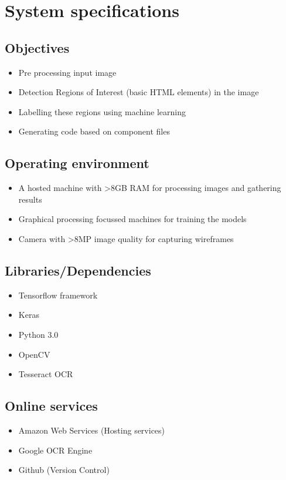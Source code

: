 
\chapter{System specifications}

  \section{Objectives}
    \begin{itemize}
      \item Pre processing input image
      \item Detection Regions of Interest (basic HTML elements) in the image
      \item Labelling these regions using machine learning
      \item Generating code based on component files
  	\end{itemize}
  \section{Operating environment}
    \begin{itemize}
      \item A hosted machine with >8GB RAM for processing images and gathering results
      \item Graphical processing focussed machines for training the models
      \item Camera with >8MP image quality for capturing wireframes
    \end{itemize}
  \section{Libraries/Dependencies}
    \begin{itemize}
      \item Tensorflow framework
      \item Keras
      \item Python 3.0
      \item OpenCV
      \item Tesseract OCR
    \end{itemize}
  \section{Online services}
    \begin{itemize}
      \item Amazon Web Services (Hosting services)
      \item Google OCR Engine
      \item Github (Version Control)
    \end{itemize}



